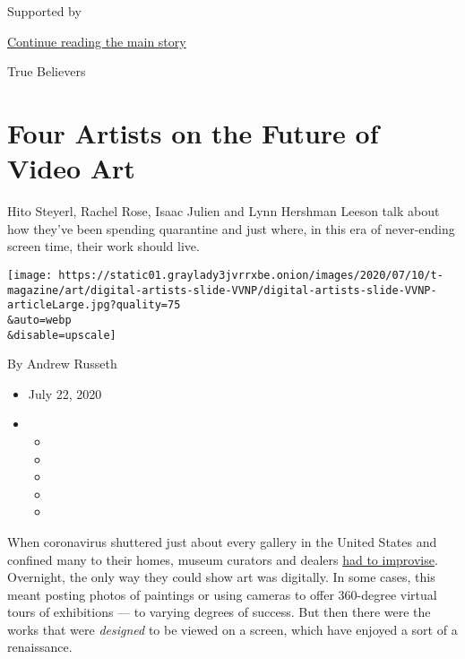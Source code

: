 Supported by

\protect\hyperlink{after-sponsor}{Continue reading the main story}

True Believers

\hypertarget{four-artists-on-the-future-of-video-art}{%
\section{Four Artists on the Future of Video
Art}\label{four-artists-on-the-future-of-video-art}}

Hito Steyerl, Rachel Rose, Isaac Julien and Lynn Hershman Leeson talk
about how they've been spending quarantine and just where, in this era
of never-ending screen time, their work should live.

\texttt{[image: https://static01.graylady3jvrrxbe.onion/images/2020/07/10/t-magazine/art/digital-artists-slide-VVNP/digital-artists-slide-VVNP-articleLarge.jpg?quality=75\\\&auto=webp\\\&disable=upscale]}

By Andrew Russeth

\begin{itemize}
\item
  July 22, 2020
\item
  \begin{itemize}
  \item
  \item
  \item
  \item
  \item
  \end{itemize}
\end{itemize}

When coronavirus shuttered just about every gallery in the United States
and confined many to their homes, museum curators and dealers
\href{https://www.nytimes3xbfgragh.onion/2020/03/16/arts/design/art-galleries-online-viewing-coronavirus.html}{had
to improvise}. Overnight, the only way they could show art was
digitally. In some cases, this meant posting photos of paintings or
using cameras to offer 360-degree virtual tours of exhibitions --- to
varying degrees of success. But then there were the works that were
\emph{designed} to be viewed on a screen, which have enjoyed a sort of a
renaissance.

